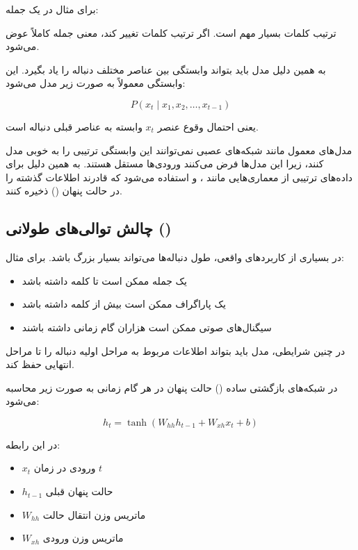 \documentclass{article}
\begin{document}
برای مثال در یک جمله:

\begin{center}
\end{center}

ترتیب کلمات بسیار مهم است. اگر ترتیب کلمات تغییر کند، معنی جمله کاملاً عوض می‌شود.

به همین دلیل مدل باید بتواند وابستگی بین عناصر مختلف دنباله را یاد بگیرد. این وابستگی معمولاً به صورت زیر مدل می‌شود:

\begin{equation}
	P(x_t \mid x_1, x_2, \dots, x_{t-1})
\end{equation}

یعنی احتمال وقوع عنصر \(x_t\) وابسته به عناصر قبلی دنباله است.

مدل‌های معمول مانند شبکه‌های عصبی  نمی‌توانند این وابستگی ترتیبی را به خوبی مدل کنند، زیرا این مدل‌ها فرض می‌کنند ورودی‌ها مستقل هستند. 
به همین دلیل برای داده‌های ترتیبی از معماری‌هایی مانند ،  و  استفاده می‌شود که قادرند اطلاعات گذشته را در حالت پنهان () ذخیره کنند.

\subsection{چالش توالی‌های طولانی ()}

در بسیاری از کاربردهای واقعی، طول دنباله‌ها می‌تواند بسیار بزرگ باشد. 
برای مثال:

\begin{itemize}
	\item یک جمله ممکن است  تا  کلمه داشته باشد
	\item یک پاراگراف ممکن است بیش از  کلمه داشته باشد
	\item سیگنال‌های صوتی ممکن است هزاران گام زمانی داشته باشند
\end{itemize}

در چنین شرایطی، مدل باید بتواند اطلاعات مربوط به مراحل اولیه دنباله را تا مراحل انتهایی حفظ کند.

در شبکه‌های بازگشتی ساده () حالت پنهان در هر گام زمانی به صورت زیر محاسبه می‌شود:

\begin{equation}
	h_t = \tanh(W_{hh}h_{t-1} + W_{xh}x_t + b)
\end{equation}

در این رابطه:

\begin{itemize}
	\item \(x_t\) ورودی در زمان \(t\)
	\item \(h_{t-1}\) حالت پنهان قبلی
	\item \(W_{hh}\) ماتریس وزن انتقال حالت
	\item \(W_{xh}\) ماتریس وزن ورودی
\end{itemize}
\end{document}
